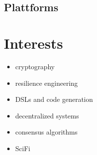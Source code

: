 \documentclass{gnet_cv}
\begin{document}
\subsection{Plattforms}

\section{Interests}
\begin{minipage}[t]{0.45\textwidth}
\begin{itemize}
    \setlength\itemsep{0pt}
    \item cryptography
    \item resilience engineering
    \item DSLs and code generation
\end{itemize}
\end{minipage}
\begin{minipage}[t]{0.45\textwidth}
\begin{itemize}
    \setlength\itemsep{0pt}
    \item decentralized systems
    \item consensus algorithms
    \item SciFi
\end{itemize}
\end{minipage}
\end{document}
